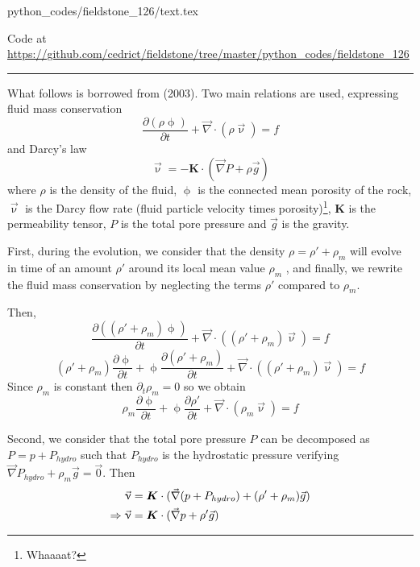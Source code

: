 \begin{flushright} {\tiny {\color{gray} python\_codes/fieldstone\_126/text.tex}} \end{flushright}

%

\begin{center}

Code at \url{https://github.com/cedrict/fieldstone/tree/master/python_codes/fieldstone_126}
\end{center}

\par\noindent\rule{\textwidth}{0.4pt}



What follows is borrowed from \textcite{grfr03} (2003).
Two main relations are used, expressing fluid mass conservation
\[
\frac{\partial (\rho \upphi)}{\partial t} + \vec\nabla\cdot (\rho \vec{\upnu}) = f
\]
and Darcy's law
\[
\vec\upnu = - {\bm K} \cdot (\vec{\nabla} P + \rho \vec{g})
\]
where $\rho$ is the density of the fluid, $\upphi$ is the
connected mean porosity of the rock, $\vec{\upnu}$ is the Darcy flow
rate (fluid particle velocity times porosity)\footnote{Whaaaat?}, ${\bm K}$ is the
permeability tensor, $P$ is the total pore pressure and $\vec{g}$ is
the gravity.

First, during the evolution, we consider that the density 
$\rho = \rho' + \rho_m$ will evolve in time of an amount $\rho'$ 
around its local mean value $\rho_m$ , and finally, we rewrite the fluid mass
conservation by neglecting the terms $\rho'$ compared to $\rho_m$.

Then,
\[
\frac{\partial ((\rho'+\rho_m) \upphi)}{\partial t} + \vec\nabla\cdot ((\rho'+\rho_m) \vec{\upnu}) = f
\]
\[
(\rho'+\rho_m) \frac{\partial \upphi}{\partial t} 
+\upphi \frac{\partial (\rho'+\rho_m)}{\partial t} 
+ \vec\nabla\cdot ((\rho'+\rho_m) \vec{\upnu}) = f
\]
Since $\rho_m$ is constant then $\partial_t \rho_m =0$ so we obtain
\[
\rho_m \frac{\partial \upphi}{\partial t} 
+\upphi \frac{\partial \rho' }{\partial t} 
+ \vec\nabla\cdot (\rho_m \vec{\upnu}) = f
\]


Second, we consider that the total pore pressure $P$ can
be decomposed as $P = p + P_{hydro}$ such that $P_{hydro}$ is the
hydrostatic pressure verifying $\vec\nabla P_{hydro} + \rho_m \vec{g} = \vec{0}$. 
Then 
\begin{align}
\vec\upnu &= {\bm K} \cdot (\vec{\nabla} (p + P_{hydro}) + (\rho'+\rho_m) \vec{g}) \nonumber\\
\Rightarrow \vec\upnu &= {\bm K} \cdot (\vec{\nabla} p + \rho' \vec{g}) \nonumber
\end{align}



